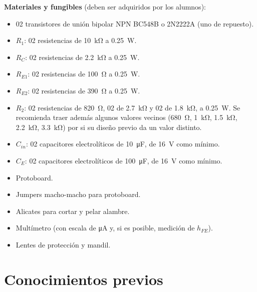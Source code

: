 \documentclass[11pt,a4paper]{article}
\begin{document}
\vspace{0.25cm}
\noindent\textbf{Materiales y fungibles} (deben ser adquiridos por los alumnos):
\begin{itemize}
    \item 02 transistores de unión bipolar NPN BC548B o 2N2222A (uno de repuesto).
    \item $R_1$: 02 resistencias de \qty{10}{\kilo\ohm} a \qty{0.25}{\watt}.
    \item $R_C$: 02 resistencias de \qty{2.2}{\kilo\ohm} a \qty{0.25}{\watt}.
    \item $R_{E1}$: 02 resistencias de \qty{100}{\ohm} a \qty{0.25}{\watt}.
    \item $R_{E2}$: 02 resistencias de \qty{390}{\ohm} a \qty{0.25}{\watt}.
    \item $R_2$: 02 resistencias de \qty{820}{\ohm}, 02 de \qty{2.7}{\kilo\ohm} y 02 de
          \qty{1.8}{\kilo\ohm}, a \qty{0.25}{\watt}. Se recomienda traer además algunos
          valores vecinos (\qty{680}{\ohm}, \qty{1}{\kilo\ohm}, \qty{1.5}{\kilo\ohm},
          \qty{2.2}{\kilo\ohm}, \qty{3.3}{\kilo\ohm}) por si su diseño previo da un valor
          distinto.
    \item $C_{in}$: 02 capacitores electrolíticos de \qty{10}{\micro\farad}, de
          \qty{16}{\volt} como mínimo.
    \item $C_E$: 02 capacitores electrolíticos de \qty{100}{\micro\farad}, de
          \qty{16}{\volt} como mínimo.
    \item Protoboard.
    \item Jumpers macho-macho para protoboard.
    \item Alicates para cortar y pelar alambre.
    \item Multímetro (con escala de \unit{\micro\ampere} y, si es posible, medición de
          $h_{FE}$).
    \item Lentes de protección y mandil.
\end{itemize}

\FloatBarrier
\section{Conocimientos previos}
\end{document}
